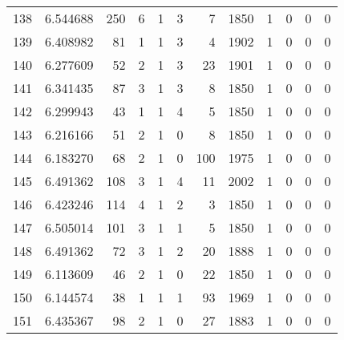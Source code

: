 \begin{tabular}{lrrrrrrrrrrr}
138 &  6.544688 &  250 &      6 &        1 &      3 &               7 &  1850 &               1 &               0 &               0 &               0 \\
139 &  6.408982 &   81 &      1 &        1 &      3 &               4 &  1902 &               1 &               0 &               0 &               0 \\
140 &  6.277609 &   52 &      2 &        1 &      3 &              23 &  1901 &               1 &               0 &               0 &               0 \\
141 &  6.341435 &   87 &      3 &        1 &      3 &               8 &  1850 &               1 &               0 &               0 &               0 \\
142 &  6.299943 &   43 &      1 &        1 &      4 &               5 &  1850 &               1 &               0 &               0 &               0 \\
143 &  6.216166 &   51 &      2 &        1 &      0 &               8 &  1850 &               1 &               0 &               0 &               0 \\
144 &  6.183270 &   68 &      2 &        1 &      0 &             100 &  1975 &               1 &               0 &               0 &               0 \\
145 &  6.491362 &  108 &      3 &        1 &      4 &              11 &  2002 &               1 &               0 &               0 &               0 \\
146 &  6.423246 &  114 &      4 &        1 &      2 &               3 &  1850 &               1 &               0 &               0 &               0 \\
147 &  6.505014 &  101 &      3 &        1 &      1 &               5 &  1850 &               1 &               0 &               0 &               0 \\
148 &  6.491362 &   72 &      3 &        1 &      2 &              20 &  1888 &               1 &               0 &               0 &               0 \\
149 &  6.113609 &   46 &      2 &        1 &      0 &              22 &  1850 &               1 &               0 &               0 &               0 \\
150 &  6.144574 &   38 &      1 &        1 &      1 &              93 &  1969 &               1 &               0 &               0 &               0 \\
151 &  6.435367 &   98 &      2 &        1 &      0 &              27 &  1883 &               1 &               0 &               0 &               0 \\

\end{tabular}
